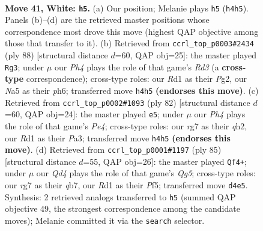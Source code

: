 \documentclass[11pt]{article}
\begin{document}
\clearpage

\begin{figure}[p]\centering
\begin{subfigure}{0.46\textwidth}\centering
\resizebox{\linewidth}{!}{%
\newchessgame
\chessboard[
  setfen={2r3k1/6rp/8/Np6/3Q2PP/8/PP3PK1/3R4 w - - 3 41},
  showmover=false,
  pgfstyle=straightmove, color=movearrow, markmove={h4-h5}
]}
\caption{}
\end{subfigure}\hfill
\begin{subfigure}{0.46\textwidth}\centering
\resizebox{\linewidth}{!}{%
\newchessgame
\chessboard[
  setfen={4r1k1/2q2pp1/7p/8/3Q1P2/3R3P/6PK/8 w - - 19 45},
  showmover=false,
  pgfstyle=straightmove, color=movearrow, markmove={d3-g3}
]}
\caption{}
\end{subfigure}
\\[4pt]
\begin{subfigure}{0.46\textwidth}\centering
\resizebox{\linewidth}{!}{%
\newchessgame
\chessboard[
  setfen={5rk1/5pp1/8/2R4p/2Q1P3/P7/KP5q/8 w - - 0 42},
  showmover=false,
  pgfstyle=straightmove, color=movearrow, markmove={e4-e5}
]}
\caption{}
\end{subfigure}\hfill
\begin{subfigure}{0.46\textwidth}\centering
\resizebox{\linewidth}{!}{%
\newchessgame
\chessboard[
  setfen={8/pQ4pk/8/5p2/6q1/7r/PP2R3/R4K2 b - - 19 43},
  showmover=false,
  pgfstyle=straightmove, color=movearrow, markmove={g4-f4}
]}
\caption{}
\end{subfigure}
\caption{\textbf{Move 41, White: \texttt{h5}.} (a) Our position; Melanie plays \texttt{h5} (\texttt{h4h5}). Panels (b)--(d) are the retrieved master positions whose correspondence most drove this move (highest QAP objective among those that transfer to it). (b) Retrieved from \texttt{ccrl\_top\_p0003\#2434} (ply 88) [structural distance $d$=60, QAP obj=25]: the master played \texttt{Rg3}; under $\mu$ our \emph{Ph4} plays the role of that game's \emph{Rd3} (a \textbf{cross-type} correspondence); cross-type roles: our \emph{R}d1 as their \emph{P}g2, our \emph{N}a5 as their \emph{p}h6; transferred move \texttt{h4h5} \textbf{(endorses this move)}. (c) Retrieved from \texttt{ccrl\_top\_p0002\#1093} (ply 82) [structural distance $d$=60, QAP obj=24]: the master played \texttt{e5}; under $\mu$ our \emph{Ph4} plays the role of that game's \emph{Pe4}; cross-type roles: our \emph{r}g7 as their \emph{q}h2, our \emph{R}d1 as their \emph{P}a3; transferred move \texttt{h4h5} \textbf{(endorses this move)}. (d) Retrieved from \texttt{ccrl\_top\_p0001\#1197} (ply 85) [structural distance $d$=55, QAP obj=26]: the master played \texttt{Qf4+}; under $\mu$ our \emph{Qd4} plays the role of that game's \emph{Qg5}; cross-type roles: our \emph{r}g7 as their \emph{q}b7, our \emph{R}d1 as their \emph{P}f5; transferred move \texttt{d4e5}. Synthesis: 2 retrieved analogs transferred to \texttt{h5} (summed QAP objective 49, the strongest correspondence among the candidate moves); Melanie committed it via the \texttt{search} selector.}
\label{fig:thought-m80}
\end{figure}
\end{document}
